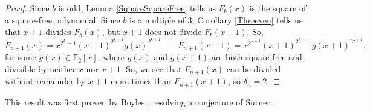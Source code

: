 \documentclass[a4paper]{article}
\newcommand{\F}{\mathbb{F}}
\begin{document}
\begin{proof}
		Since $b$ is odd, Lemma \ref{SquareSquareFree} tells us $F_b(x)$ is the square of a square-free polynomial.
		Since $b$ is a multiple of 3, Corollary \ref{Threeven} tells us that $x+1$ divides $F_{b}(x)$, but $x+1$ does not divide $F_b(x+1)$.
		So,
		\begin{equation*}
			F_{n+1}(x) = x^{2^{k}-1}(x+1)^{2^{k+1}}g(x)^{2^{k+1}} \qquad F_{n+1}(x+1) = x^{2^{k+1}}(x+1)^{2^{k}-1}g(x+1)^{2^{k+1}},
		\end{equation*}
		for some $g(x) \in \F_2[x]$, where $g(x)$ and $g(x+1)$ are both square-free and divisible by neither $x$ nor $x+1$.
		So, we see that $F_{n+1}(x)$ can be divided without remainder by $x+1$ more times than $F_{n+1}(x+1)$, so $\delta_n = 2$.
	\end{proof}
	This result was first proven by Boyles \cite{boylesResolutionSutner}, resolving a conjecture of Sutner \cite{Sutner1989}.
	
\end{document}
